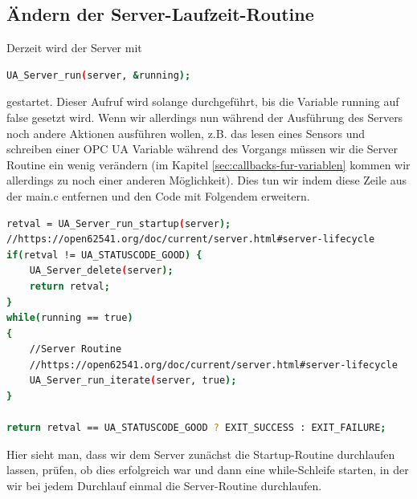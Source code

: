 \subsection{Ändern der Server-Laufzeit-Routine}
Derzeit wird der Server mit
\begin{lstlisting}[language=Bash]
UA_Server_run(server, &running);
\end{lstlisting}
gestartet. Dieser Aufruf wird solange durchgeführt, bis die Variable running auf false gesetzt wird. Wenn wir allerdings nun während der Ausführung des Servers noch andere Aktionen ausführen wollen, z.B. das lesen eines Sensors und schreiben einer OPC UA Variable während des Vorgangs müssen wir die Server Routine ein wenig verändern (im Kapitel \autoref{sec:callbacks-fur-variablen} kommen wir allerdings zu noch einer anderen Möglichkeit).
Dies tun wir indem diese Zeile aus der main.c entfernen und den Code mit Folgendem erweitern.
\begin{lstlisting}[language=Bash]
retval = UA_Server_run_startup(server);
//https://open62541.org/doc/current/server.html#server-lifecycle
if(retval != UA_STATUSCODE_GOOD) {
	UA_Server_delete(server);
	return retval;
}
while(running == true)
{
	//Server Routine
	//https://open62541.org/doc/current/server.html#server-lifecycle
	UA_Server_run_iterate(server, true);
}

return retval == UA_STATUSCODE_GOOD ? EXIT_SUCCESS : EXIT_FAILURE;
\end{lstlisting}
Hier sieht man, dass wir dem Server zunächst die Startup-Routine durchlaufen lassen, prüfen, ob dies erfolgreich war und dann eine while-Schleife starten, in der wir bei jedem Durchlauf einmal die Server-Routine durchlaufen.

